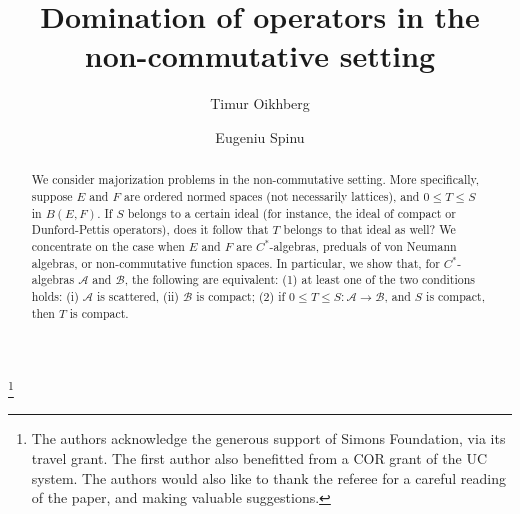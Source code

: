 \documentclass[12pt]{amsart}
\theoremstyle{plain}
\theoremstyle{definition}
\renewcommand{\leq}{\leqslant}
\newcommand{\A}{\mathcal{A}}
\begin{document}
\baselineskip=16pt


\pagestyle{headings}


\title[Domination of operators]{Domination of operators in the non-commutative
setting}


\author[T. Oikhberg]{Timur Oikhberg}
\address{
Dept.~of Mathematics, University of Illinois at Urbana-Champaign, Urbana IL 61801, USA}

\author[E. Spinu]{Eugeniu Spinu}
\address{Dept. of Mathematical and Statistical Sciences, University of Alberta
Edmonton, Alberta  T6G 2G1, CANADA}


\begin{abstract}
We consider majorization problems in the non-commutative setting.
More specifically, suppose $E$ and $F$ are ordered normed spaces
(not necessarily lattices), and $0 \leq T \leq S$ in $B(E,F)$.
If $S$ belongs to a certain ideal (for instance, the ideal of compact
or Dunford-Pettis operators), does it follow that $T$ belongs to that
ideal as well? We concentrate on the case when $E$ and $F$ are
$C^*$-algebras, preduals of von Neumann algebras, or non-commutative
function spaces.
In particular, we show that, for $C^*$-algebras $\A$ and ${\mathcal{B}}$,
the following are equivalent: (1) at least one of the two conditions holds:
(i) $\A$ is scattered, (ii) ${\mathcal{B}}$ is compact;
(2) if $0 \leq T \leq S : \A \to {\mathcal{B}}$, and $S$ is compact,
then $T$ is compact.
\end{abstract}

\thanks{The authors acknowledge the generous support of Simons Foundation,
via its travel grant. The first author also benefitted from a COR grant of
the UC system. The authors would also like to thank the referee for a
careful reading of the paper, and making valuable suggestions.}


\maketitle



\end{document}
